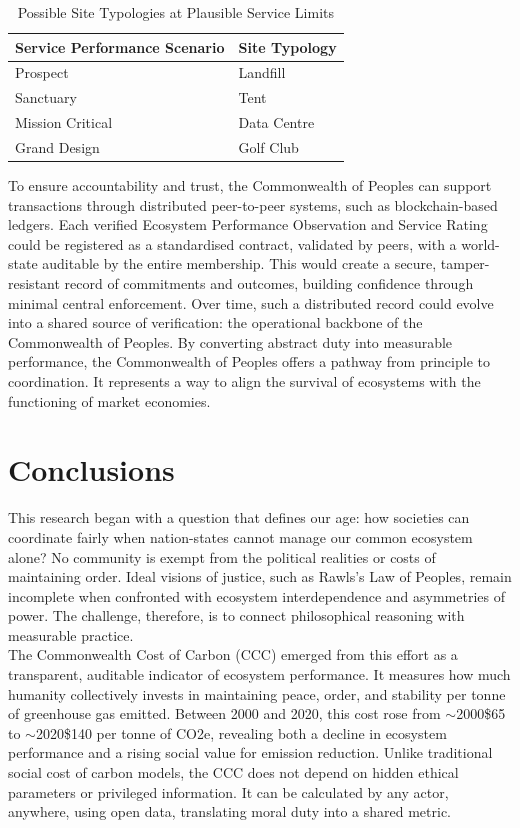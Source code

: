 \documentclass[12pt, oneside]{article}   	%
\begin{document}
\begin{table}[H]
\caption{Possible Site Typologies at Plausible Service Limits}
\begin{center}
\begin{tabular}{| l | l |}
\hline
Service Performance Scenario&Site Typology\\
\hline
Prospect&Landfill\\
Sanctuary&Tent\\
Mission Critical&Data Centre\\
Grand Design&Golf Club\\
\hline
\end{tabular}
\end{center}
\label{Service limits table}
\end{table}

To ensure accountability and trust, the Commonwealth of Peoples can support transactions through distributed peer-to-peer systems, such as blockchain-based ledgers.
Each verified Ecosystem Performance Observation and Service Rating could be registered as a standardised contract, validated by peers, with a world-state auditable by the entire membership.
This would create a secure, tamper-resistant record of commitments and outcomes, building confidence through minimal central enforcement.
Over time, such a distributed record could evolve into a shared source of verification: the operational backbone of the Commonwealth of Peoples.
By converting abstract duty into measurable performance, the Commonwealth of Peoples offers a pathway from principle to coordination.
It represents a way to align the survival of ecosystems with the functioning of market economies.\\

\section{Conclusions}

This research began with a question that defines our age: how societies can coordinate fairly when nation-states cannot manage our common ecosystem alone?
No community is exempt from the political realities or costs of maintaining order.
Ideal visions of justice, such as Rawls’s Law of Peoples, remain incomplete when confronted with ecosystem interdependence and asymmetries of power.
The challenge, therefore, is to connect philosophical reasoning with measurable practice.\\

The Commonwealth Cost of Carbon (CCC) emerged from this effort as a transparent, auditable indicator of ecosystem performance.
It measures how much humanity collectively invests in maintaining peace, order, and stability per tonne of greenhouse gas emitted.
Between 2000 and 2020, this cost rose from $\sim$2000\$65 to $\sim$2020\$140 per tonne of CO2e, revealing both a decline in ecosystem performance and a rising social value for emission reduction.
Unlike traditional social cost of carbon models, the CCC does not depend on hidden ethical parameters or privileged information.
It can be calculated by any actor, anywhere, using open data, translating moral duty into a shared metric.\\
\end{document}
